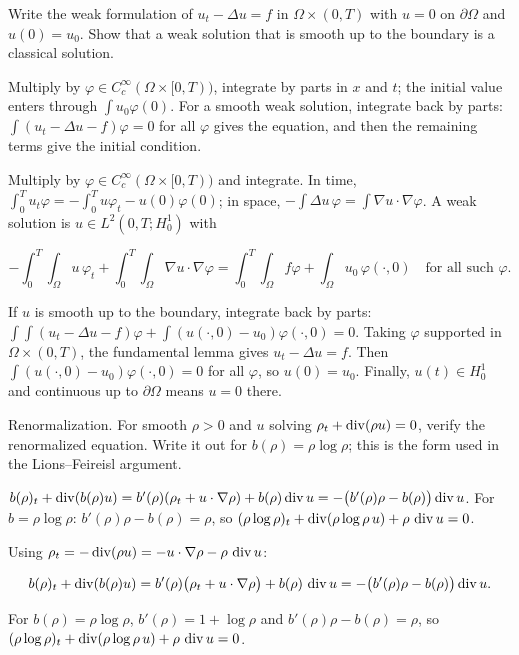 \begin{exercise}
  Write the weak formulation of $u_t - \Delta u = f$ in $\Omega\times(0,T)$ with $u = 0$ on $\partial\Omega$ and $u(0) = u_0$. Show that a weak solution that is smooth up to the boundary is a classical solution.
  \begin{hint}
    Multiply by $\varphi \in C_c^\infty(\Omega\times[0,T))$, integrate by parts in $x$ and $t$; the initial value enters through $\int u_0\varphi(0)$. For a smooth weak solution, integrate back by parts: $\int(u_t - \Delta u - f)\varphi = 0$ for all $\varphi$ gives the equation, and then the remaining terms give the initial condition.
  \end{hint}
  \begin{solution}
    Multiply by $\varphi \in C_c^\infty(\Omega\times[0,T))$ and integrate. In time, $\int_0^T u_t\varphi = -\int_0^T u\varphi_t - u(0)\varphi(0)$; in space, $-\int\Delta u\,\varphi = \int\nabla u\cdot\nabla\varphi$. A weak solution is $u \in L^2(0,T;H^1_0)$ with

    \[ -\int_0^T\!\!\int_\Omega u\,\varphi_t + \int_0^T\!\!\int_\Omega\nabla u\cdot\nabla\varphi = \int_0^T\!\!\int_\Omega f\varphi + \int_\Omega u_0\,\varphi(\cdot,0)
             \quad\text{for all such }\varphi. \]

    If $u$ is smooth up to the boundary, integrate back by parts: $\int\!\!\int(u_t - \Delta u - f)\varphi + \int(u(\cdot,0) - u_0)\varphi(\cdot,0) = 0$. Taking $\varphi$ supported in $\Omega\times(0,T)$, the fundamental lemma gives $u_t - \Delta u = f$. Then $\int(u(\cdot,0) - u_0)\varphi(\cdot,0) = 0$ for all $\varphi$, so $u(0) = u_0$. Finally, $u(t) \in H^1_0$ and continuous up to $\partial\Omega$ means $u = 0$ there.
  \end{solution}
\end{exercise}

\begin{exercise}
  Renormalization. For smooth $\rho > 0$ and $u$ solving $\rho_t + \operatorname{div}(\rho u) = 0$, verify the renormalized equation. Write it out for $b(\rho) = \rho\log\rho$; this is the form used in the Lions--Feireisl argument.
  \begin{hint}
    $b(\rho)_t + \operatorname{div}(b(\rho)u) = b'(\rho)(\rho_t + u\cdot\nabla\rho) + b(\rho)\operatorname{div} u = -\big(b'(\rho)\rho - b(\rho)\big)\operatorname{div} u$. For $b = \rho\log\rho$: $b'(\rho)\rho - b(\rho) = \rho$, so $(\rho\log\rho)_t + \operatorname{div}(\rho\log\rho\,u) + \rho\,\operatorname{div} u = 0$.
  \end{hint}
  \begin{solution}
    Using $\rho_t = -\operatorname{div}(\rho u) = -u\cdot\nabla\rho - \rho\,\operatorname{div} u$:

    \[ b(\rho)_t + \operatorname{div}(b(\rho)u) = b'(\rho)\big(\rho_t + u\cdot\nabla\rho\big) + b(\rho)\,\operatorname{div} u = -\big(b'(\rho)\rho - b(\rho)\big)\operatorname{div} u. \]

    For $b(\rho) = \rho\log\rho$, $b'(\rho) = 1 + \log\rho$ and $b'(\rho)\rho - b(\rho) = \rho$, so $(\rho\log\rho)_t + \operatorname{div}(\rho\log\rho\,u) + \rho\,\operatorname{div} u = 0$.
  \end{solution}
\end{exercise}

